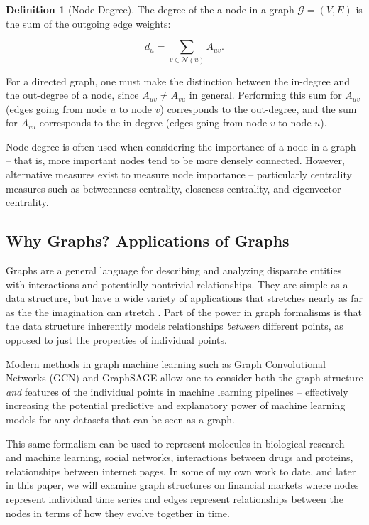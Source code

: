 \documentclass{article}
\theoremstyle{definition}
\newtheorem{definition}{Definition}[section]
\begin{document}
\begin{definition}[Node Degree]
The degree of the a node in a graph $\mathcal{G} = (V, E)$ is the sum of the outgoing edge weights:

\[
d_u = \sum_{v \in \mathcal{N}(u)} A_{uv}.
\]

For a directed graph, one must make the distinction between the in-degree and the out-degree of a node, since $A_{uv} \neq A_{vu}$ in general. Performing this sum for $A_{uv}$ (edges going from node $u$ to node $v$) corresponds to the out-degree, and the sum for $A_{vu}$ corresponds to the in-degree (edges going from node $v$ to node $u$).
\end{definition}

Node degree is often used when considering the importance of a node in a graph -- that is, more important nodes tend to be more densely connected. However, alternative measures exist to measure node importance -- particularly centrality measures such as betweenness centrality, closeness centrality, and eigenvector centrality. 

\subsection{Why Graphs? Applications of Graphs}
\label{sec:motivation}

Graphs are a general language for describing and analyzing disparate entities with interactions and potentially nontrivial relationships. They are simple as a data structure, but have a wide variety of applications that stretches nearly as far as the the imagination can stretch \cite{hamiltonGRL}. Part of the power in graph formalisms is that the data structure inherently models relationships \textit{between} different points, as opposed to just the properties of individual points. 

Modern methods in graph machine learning such as Graph Convolutional Networks (GCN) \cite{GCNPaper} and GraphSAGE \cite{graphSAGE} allow one to consider both the graph structure \textit{and} features of the individual points in machine learning pipelines -- effectively increasing the potential predictive and explanatory power of machine learning models for any datasets that can be seen as a graph. 

This same formalism can be used to represent molecules in biological research and machine learning, social networks, interactions between drugs and proteins, relationships between internet pages. In some of my own work to date, and later in this paper, we will examine graph structures on financial markets where nodes represent individual time series and edges represent relationships between the nodes in terms of how they evolve together in time. 
\end{document}

